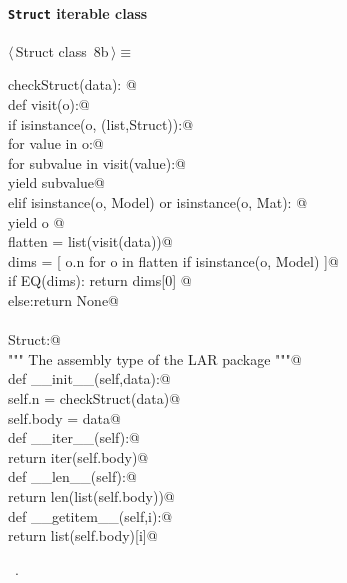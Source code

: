 \documentclass[11pt,oneside]{article}	%
\begin{document}
\paragraph{\texttt{Struct} iterable class}
\begin{flushleft} \small \label{scrap24}
\protect{}$\langle\,$Struct class\nobreak\ {\footnotesize 8b}$\,\rangle\equiv$
\vspace{-1ex}
\begin{list}{}{} \item
\mbox{}\verb@def checkStruct(data):  @\\
\mbox{}\verb@   def visit(o):@\\
\mbox{}\verb@       if isinstance(o, (list,Struct)):@\\
\mbox{}\verb@           for value in o:@\\
\mbox{}\verb@               for subvalue in visit(value):@\\
\mbox{}\verb@                   yield subvalue@\\
\mbox{}\verb@       elif isinstance(o, Model) or isinstance(o, Mat): @\\
\mbox{}\verb@         yield o     @\\
\mbox{}\verb@   flatten = list(visit(data))@\\
\mbox{}\verb@   dims = [ o.n for o in flatten if isinstance(o, Model) ]@\\
\mbox{}\verb@   if EQ(dims): return dims[0] @\\
\mbox{}\verb@   else:return None@\\
\mbox{}\verb@@\\
\mbox{}\verb@class Struct:@\\
\mbox{}\verb@    """ The assembly type of the LAR package """@\\
\mbox{}\verb@    def __init__(self,data):@\\
\mbox{}\verb@        self.n = checkStruct(data)@\\
\mbox{}\verb@        self.body = data@\\
\mbox{}\verb@    def __iter__(self):@\\
\mbox{}\verb@        return iter(self.body)@\\
\mbox{}\verb@    def __len__(self):@\\
\mbox{}\verb@        return len(list(self.body))@\\
\mbox{}\verb@    def __getitem__(self,i):@\\
\mbox{}\verb@        return list(self.body)[i]@\\
\mbox{}\verb@@{\NWsep}
\end{list}
\vspace{-1ex}
\footnotesize\addtolength{\baselineskip}{-1ex}
\begin{list}{}{\setlength{\itemsep}{-\parsep}\setlength{\itemindent}{-\leftmargin}}
\item \NWtxtMacroRefIn\ .
\end{list}
\end{flushleft}
\end{document}
